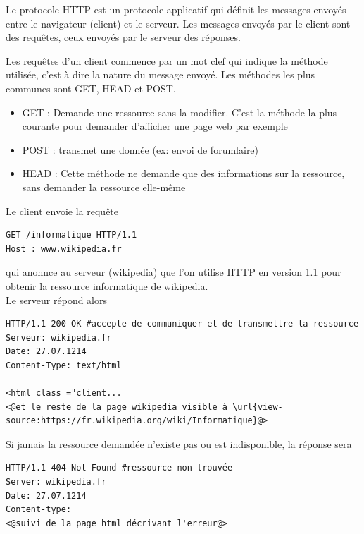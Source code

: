 \begin{definition}
	Le protocole HTTP est un protocole applicatif qui définit les messages envoyés entre le navigateur (client) et le serveur. Les messages envoyés par le client sont des requêtes, ceux envoyés par le serveur des réponses. 
\end{definition}

\begin{definition}[méthode]
	Les requêtes d'un client commence par un mot clef qui indique la méthode utilisée, c'est à dire la nature du message envoyé. Les méthodes les plus communes sont GET, HEAD et POST.
\end{definition}

\begin{itemize}[label=$\star$]
	\item GET : Demande une ressource sans la modifier. C'est la méthode la plus courante pour demander d'afficher une page web par exemple
	\item POST : transmet une donnée (ex: envoi de forumlaire)
	\item HEAD : Cette méthode ne demande que des informations sur la ressource, sans demander la ressource elle-même
\end{itemize}

\begin{example}
	Le client envoie la requête
	\begin{lstlisting}
GET /informatique HTTP/1.1
Host : www.wikipedia.fr
	\end{lstlisting}
	qui anonnce au serveur (wikipedia) que l'on utilise HTTP en version 1.1 pour obtenir la ressource informatique de wikipedia.\\
	
	Le serveur répond alors
	\begin{lstlisting}
HTTP/1.1 200 OK #accepte de communiquer et de transmettre la ressource
Serveur: wikipedia.fr
Date: 27.07.1214
Content-Type: text/html

<html class ="client...
<@et le reste de la page wikipedia visible à \url{view-source:https://fr.wikipedia.org/wiki/Informatique}@>
	\end{lstlisting}
	Si jamais la ressource demandée n'existe pas ou est indisponible, la réponse sera
	\begin{lstlisting}
HTTP/1.1 404 Not Found #ressource non trouvée
Server: wikipedia.fr
Date: 27.07.1214
Content-type:
<@suivi de la page html décrivant l'erreur@>
	\end{lstlisting}
\end{example}

